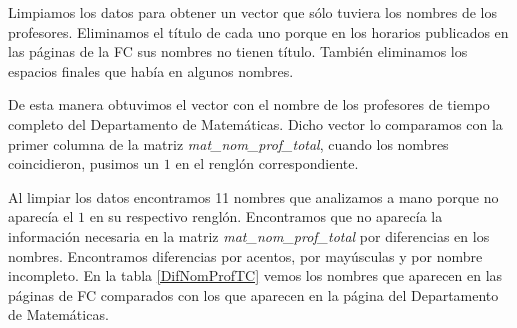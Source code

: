 Limpiamos los datos para obtener un vector que sólo tuviera los nombres de los profesores. Eliminamos el título de cada uno porque en los horarios publicados en las páginas de la FC sus nombres no tienen título. También eliminamos los espacios finales que había en algunos nombres.

De esta manera obtuvimos el vector con el nombre de los profesores de tiempo completo del Departamento de Matemáticas. Dicho vector lo comparamos con la primer columna de la matriz \textit{mat\_nom\_prof\_total}, cuando los nombres coincidieron, pusimos un $1$ en el renglón correspondiente.

Al limpiar los datos encontramos 11 nombres que analizamos a mano porque no aparecía el $1$ en su respectivo renglón. Encontramos que no aparecía la información necesaria en la matriz \textit{mat\_nom\_prof\_total} por diferencias en los nombres. Encontramos diferencias por acentos, por mayúsculas y por nombre incompleto. En la tabla \ref{DifNomProfTC} vemos los nombres que aparecen en las páginas de FC comparados con los que aparecen en la página del Departamento de Matemáticas.

\begin{table}[h]
\centering
{} 
\caption{\textit{Diferencias en nombres de profesores de tiempo completo}}\label{DifNomProfTC}
\end{table}

